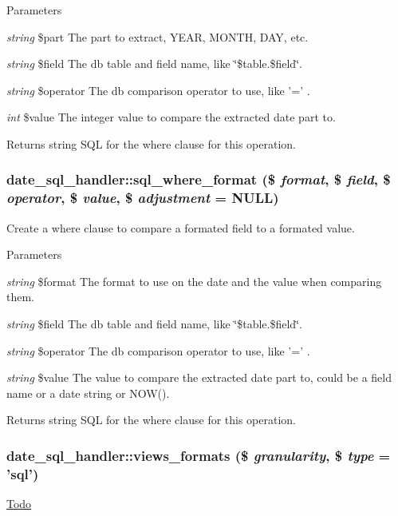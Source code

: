 \begin{DoxyParams}{Parameters}
\item[{\em string}]\$part The part to extract, YEAR, MONTH, DAY, etc. \item[{\em string}]\$field The db table and field name, like \char`\"{}\$table.\$field\char`\"{}. \item[{\em string}]\$operator The db comparison operator to use, like '=' . \item[{\em int}]\$value The integer value to compare the extracted date part to.\end{DoxyParams}
\begin{DoxyReturn}{Returns}
string SQL for the where clause for this operation. 
\end{DoxyReturn}
\hypertarget{classdate__sql__handler_a6eafe804210a031a0057e8ff84eca6a8}{
\subsubsection[{sql\_\-where\_\-format}]{\setlength{\rightskip}{0pt plus 5cm}date\_\-sql\_\-handler::sql\_\-where\_\-format (\$ {\em format}, \/  \$ {\em field}, \/  \$ {\em operator}, \/  \$ {\em value}, \/  \$ {\em adjustment} = {\ttfamily NULL})}}
\label{classdate__sql__handler_a6eafe804210a031a0057e8ff84eca6a8}
Create a where clause to compare a formated field to a formated value.


\begin{DoxyParams}{Parameters}
\item[{\em string}]\$format The format to use on the date and the value when comparing them. \item[{\em string}]\$field The db table and field name, like \char`\"{}\$table.\$field\char`\"{}. \item[{\em string}]\$operator The db comparison operator to use, like '=' . \item[{\em string}]\$value The value to compare the extracted date part to, could be a field name or a date string or NOW().\end{DoxyParams}
\begin{DoxyReturn}{Returns}
string SQL for the where clause for this operation. 
\end{DoxyReturn}
\hypertarget{classdate__sql__handler_a3a8cc9c8c0f40515901e8a7bf6299439}{
\subsubsection[{views\_\-formats}]{\setlength{\rightskip}{0pt plus 5cm}date\_\-sql\_\-handler::views\_\-formats (\$ {\em granularity}, \/  \$ {\em type} = {\ttfamily 'sql'})}}
\label{classdate__sql__handler_a3a8cc9c8c0f40515901e8a7bf6299439}
\begin{Desc}
\item[\hyperlink{todo__todo000023}{Todo}]\end{Desc}


